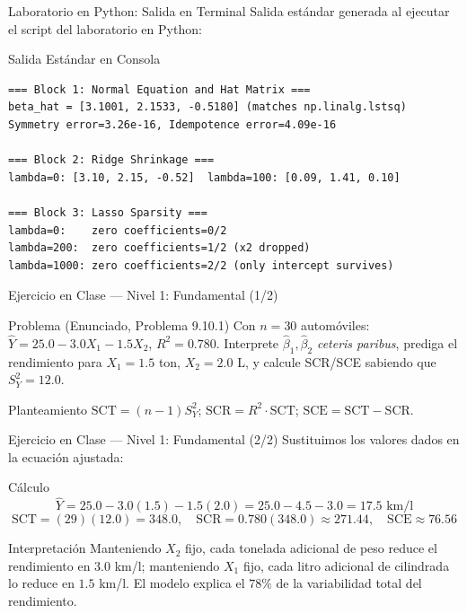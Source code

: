 \documentclass[10pt, aspectratio=169]{beamer}
\begin{document}
\begin{frame}[fragile]{Laboratorio en Python: Salida en Terminal}
  \scriptsize
  Salida estándar generada al ejecutar el script del laboratorio en Python:
  \vspace{0.02cm}
  \begin{block}{Salida Estándar en Consola}
    \fontsize{3.6pt}{4.3pt}\selectfont
    \begin{verbatim}
=== Block 1: Normal Equation and Hat Matrix ===
beta_hat = [3.1001, 2.1533, -0.5180] (matches np.linalg.lstsq)
Symmetry error=3.26e-16, Idempotence error=4.09e-16

=== Block 2: Ridge Shrinkage ===
lambda=0: [3.10, 2.15, -0.52]  lambda=100: [0.09, 1.41, 0.10]

=== Block 3: Lasso Sparsity ===
lambda=0:    zero coefficients=0/2
lambda=200:  zero coefficients=1/2 (x2 dropped)
lambda=1000: zero coefficients=2/2 (only intercept survives)
    \end{verbatim}
  \end{block}
\end{frame}

\begin{frame}{Ejercicio en Clase --- Nivel 1: Fundamental (1/2)}
  \footnotesize
  \begin{block}{Problema (Enunciado, Problema 9.10.1)}
    Con $n=30$ automóviles: $\hat Y=25.0-3.0X_1-1.5X_2$, $R^2=0.780$. Interprete $\hat\beta_1,\hat\beta_2$ \emph{ceteris paribus}, prediga el rendimiento para $X_1=1.5$ ton, $X_2=2.0$ L, y calcule SCR/SCE sabiendo que $S_Y^2=12.0$.
  \end{block}

  \vspace{0.15cm}
  \pause
  \begin{alertblock}{Planteamiento}
    $\text{SCT}=(n-1)S_Y^2$; $\text{SCR}=R^2\cdot\text{SCT}$; $\text{SCE}=\text{SCT}-\text{SCR}$.
  \end{alertblock}
\end{frame}

\begin{frame}{Ejercicio en Clase --- Nivel 1: Fundamental (2/2)}
  \scriptsize
  Sustituimos los valores dados en la ecuación ajustada: \pause

  \vspace{0.05cm}
  \begin{block}{Cálculo}
    $$\hat Y=25.0-3.0(1.5)-1.5(2.0)=25.0-4.5-3.0=17.5 \text{ km/l}$$
    $$\text{SCT}=(29)(12.0)=348.0, \quad \text{SCR}=0.780(348.0)\approx271.44, \quad \text{SCE}\approx76.56$$
  \end{block}

  \vspace{0.05cm}
  \pause
  \begin{alertblock}{Interpretación}
    Manteniendo $X_2$ fijo, cada tonelada adicional de peso reduce el rendimiento en $3.0$ km/l; manteniendo $X_1$ fijo, cada litro adicional de cilindrada lo reduce en $1.5$ km/l. El modelo explica el $78\%$ de la variabilidad total del rendimiento.
  \end{alertblock}
\end{frame}
\end{document}
